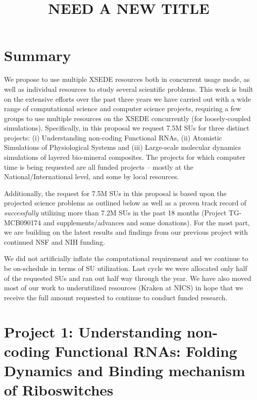 \documentclass[a4paper,10pt]{article}
\begin{document}
\title{\large NEED A NEW TITLE}

\date{}

\maketitle
 
\section{Summary}
We propose to use multiple XSEDE resources both in concurrent usage mode, as well as individual resources to study several scientific problems. This work is built on the extensive efforts over the past three years we have carried out with a wide range of computational science and computer science projects, requiring a few groups to use multiple resources on the XSEDE concurrently (for loosely-coupled simulations).  Specifically, in this proposal we request 7.5M SUs for three distinct projects: (i) Understanding non-coding Functional RNAs, (ii) Atomistic Simulations of Physiological Systems and (iii) Large-scale molecular dynamics simulations of layered bio-mineral composites. The projects for which computer time is being requested are all funded projects -- mostly at the National/International level, and some by local resources.

Additionally, the request for 7.5M SUs in this proposal is based upon the projected science problems as outlined below as well as a proven track record of {\it successfully} utilizing more than 7.2M SUs in the past 18 months (Project TG-MCB090174 and supplements/advances and some donations). For the most part, we are building on the latest results and findings from our previous project with continued NSF and NIH funding.

We did not artificially inflate the computational requirement and we continue to be on-schedule in terms of SU utilization. Last cycle we were allocated only half of the requested SUs and ran out half way through the year. We have also moved most of our work to underutilized resources (Kraken at NICS) in hope that we receive the full amount requested to continue to conduct funded research.

\section{Project 1: Understanding non-coding Functional RNAs: 
Folding Dynamics and Binding mechanism of Riboswitches}
\end{document}
